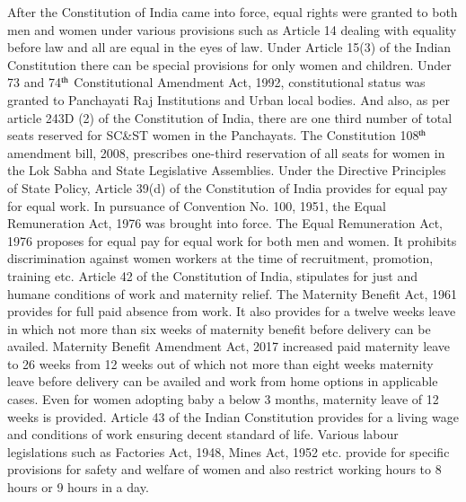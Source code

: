 \begin{multicols}{2}
\vspace{-.1cm}


\vspace{-.1cm}

\noi
After the Constitution of India came into force, equal rights were granted to both men and
women under various provisions such as Article 14 dealing with equality before law and all
are equal in the eyes of law. Under Article 15(3) of the Indian Constitution there can be
special provisions for only women and children. Under 73 and 74$^{\rm th}$ Constitutional
Amendment Act, 1992, constitutional status was granted to Panchayati Raj Institutions and
Urban local bodies. And also, as per article 243D (2) of the Constitution of India, there are
one third number of total seats reserved for SC\&ST women in the Panchayats. The
Constitution 108$^{\rm th}$ amendment bill, 2008, prescribes one-third reservation of all seats for
women in the Lok Sabha and State Legislative Assemblies. Under the Directive Principles of
State Policy, Article 39(d) of the Constitution of India provides for equal pay for equal work.
In pursuance of Convention No. 100, 1951, the Equal Remuneration Act, 1976 was brought
into force. The Equal Remuneration Act, 1976 proposes for equal pay for equal work for both 
men and women. It prohibits discrimination against women workers at the time of
recruitment, promotion, training etc. Article 42 of the Constitution of India, stipulates for just
and humane conditions of work and maternity relief. The Maternity Benefit Act, 1961
provides for full paid absence from work. It also provides for a twelve weeks leave in which
not more than six weeks of maternity benefit before delivery can be availed. Maternity
Benefit Amendment Act, 2017 increased paid maternity leave to 26 weeks from 12 weeks out
of which not more than eight weeks maternity leave before delivery can be availed and work
from home options in applicable cases. Even for women adopting baby a below 3 months,
maternity leave of 12 weeks is provided. Article 43 of the Indian Constitution provides for a
living wage and conditions of work ensuring decent standard of life. Various labour
legislations such as Factories Act, 1948, Mines Act, 1952 etc. provide for specific provisions
for safety and welfare of women and also restrict working hours to 8 hours or 9 hours in a
day.

\vspace{-.1cm}


\end{multicols}
